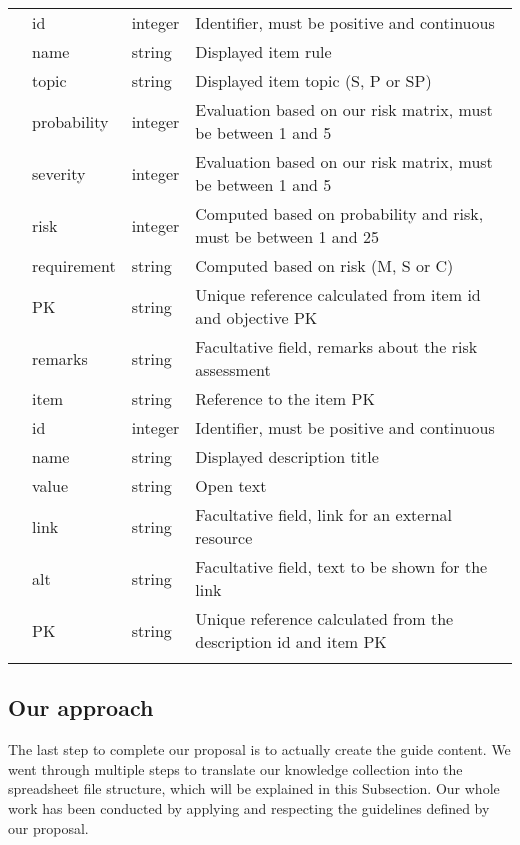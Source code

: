 \begin{tabularx}{\textwidth}{l|llX}
	& id & integer & Identifier, must be positive and continuous \\
	& name & string & Displayed item rule \\
	& topic & string & Displayed item topic (S, P or SP) \\
	& probability & integer & Evaluation based on our risk matrix, must be between 1 and 5 \\
	& severity & integer & Evaluation based on our risk matrix, must be between 1 and 5 \\
	& risk & integer & Computed based on probability and risk, must be between 1 and 25 \\
	& requirement & string & Computed based on risk (M, S or C) \\
	& PK & string & Unique reference calculated from item id and objective PK \\
	& remarks & string & Facultative field, remarks about the risk assessment \\
	\midrule
	\multicolumn{1}{c|}{\multirow{8}{*}{\rotatebox[origin=c]{90}{descriptions}}} & item & string & Reference to the item PK \\
	& id & integer & Identifier, must be positive and continuous \\
	& name & string & Displayed description title \\
	& value & string & Open text \\
	& link & string & Facultative field, link for an external resource \\
	& alt & string & Facultative field, text to be shown for the link \\
	& PK & string & Unique reference calculated from the description id and item PK \\
	\bottomrule[0.8mm]
	\caption{Attributes of the file}
	\label{table:proposal_data_attributes}
\end{tabularx}

\subsection{Our approach}
\label{subsec:proposal_data_approach}

The last step to complete our proposal is to actually create the guide content. We went through multiple steps to translate our knowledge collection into the spreadsheet file structure, which will be explained in this Subsection. Our whole work has been conducted by applying and respecting the guidelines defined by our proposal.

